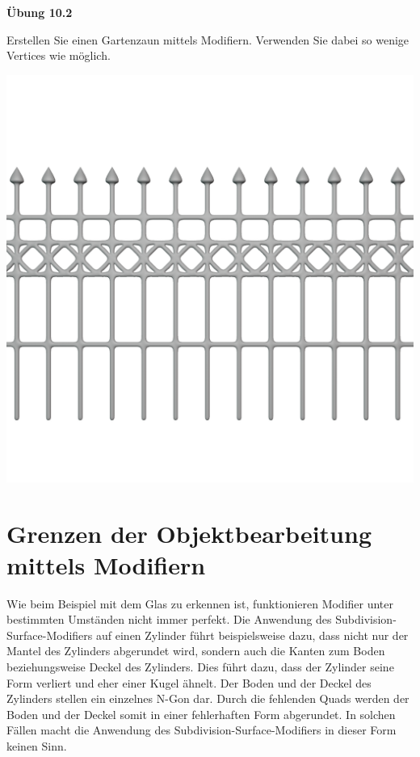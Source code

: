 \documentclass[
]{book}
\let\oldmarginnote\marginnote
\renewcommand{\marginnote}[1]{%
  \oldmarginnote{{\footnotesize\selectfont #1}}%
}
\begin{document}
\textbf{Übung 10.2}

Erstellen Sie einen Gartenzaun mittels Modifiern. Verwenden Sie dabei so
wenige Vertices wie möglich.

\includegraphics{Chapters/Images/Chapter_14/Exercise_10_2.png}\hfill

\section{Grenzen der Objektbearbeitung mittels
Modifiern}\label{grenzen-der-objektbearbeitung-mittels-modifiern}

\marginnote{Grenzen von Modifiern}

Wie beim Beispiel mit dem Glas zu erkennen ist, funktionieren Modifier
unter bestimmten Umständen nicht immer perfekt. Die Anwendung des
Subdivision-Surface-Modifiers auf einen Zylinder führt beispielsweise
dazu, dass nicht nur der Mantel des Zylinders abgerundet wird, sondern
auch die Kanten zum Boden beziehungsweise Deckel des Zylinders. Dies
führt dazu, dass der Zylinder seine Form verliert und eher einer Kugel
ähnelt. Der Boden und der Deckel des Zylinders stellen ein einzelnes
N-Gon dar. Durch die fehlenden Quads werden der Boden und der Deckel
somit in einer fehlerhaften Form abgerundet. In solchen Fällen macht die
Anwendung des Subdivision-Surface-Modifiers in dieser Form keinen Sinn.
\end{document}
